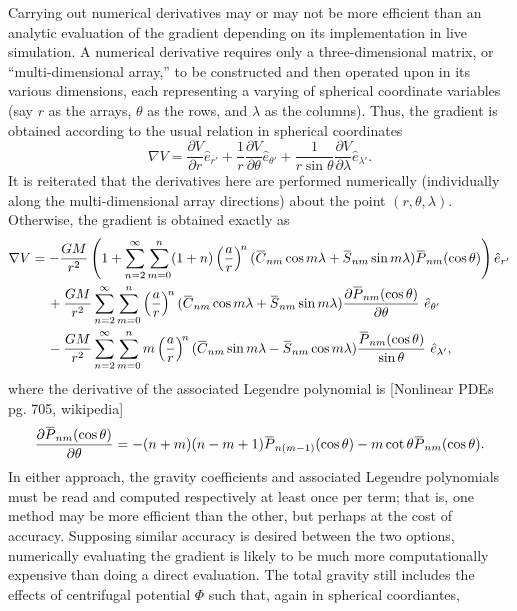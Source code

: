 \documentclass[11pt,dvipsnames]{thesis}
\newcommand{\overbar}[1]{\mkern 1.5mu\overline{\mkern-1.5mu#1\mkern-1.5mu}\mkern 1.5mu}
\begin{document}
Carrying out numerical derivatives may or may not be more efficient than an analytic evaluation of the gradient depending on its implementation in live simulation. A numerical derivative requires only a three-dimensional matrix, or ``multi-dimensional array,'' to be constructed and then operated upon in its various dimensions, each representing a varying of spherical coordinate variables (say $r$ as the arrays, $\theta$ as the rows, and $\lambda$ as the columns). Thus, the gradient is obtained according to the usual relation in spherical coordinates
\begin{equation}
\nabla V = \frac{\partial V}{\partial r} \hat{e}_{r'} + \frac{1}{r} \frac{\partial V}{\partial \theta} \hat{e}_{\theta'} + \frac{1}{r \sin\theta} \frac{\partial V}{\partial \lambda} \hat{e}_{\lambda'}.
\end{equation}
It is reiterated that the derivatives here are performed numerically (individually along the multi-dimensional array directions) about the point $(r, \theta, \lambda)$.
Otherwise, the gradient is obtained exactly as
\begin{align}
\nabla V &= -\frac{GM}{r^2} \left(1 + \sum_{n = 2}^\infty \sum_{m = 0}^n (1 + n) \left(\frac{a}{r}\right)^{\!n}(\overbar{C}_{nm} \cos m\lambda + \overbar{S}_{nm} \sin m\lambda) \overbar{P}_{nm}(\cos\theta)\right) \hat{e}_{r'} \nonumber\\
&\quad\, + \frac{GM}{r^2} \sum_{n = 2}^\infty \sum_{m = 0}^n \left(\frac{a}{r}\right)^{\!n}(\overbar{C}_{nm} \cos m\lambda + \overbar{S}_{nm} \sin m\lambda) \frac{\partial \overbar{P}_{nm}(\cos\theta)}{\partial \theta} \ \hat{e}_{\theta'} \nonumber\\
&\quad\, - \frac{GM}{r^2} \sum_{n = 2}^\infty \sum_{m = 0}^n m \left(\frac{a}{r}\right)^{\!n}(\overbar{C}_{nm} \sin m\lambda - \overbar{S}_{nm} \cos m\lambda) \frac{\overbar{P}_{nm}(\cos\theta)}{\sin\theta} \ \hat{e}_{\lambda'},
\end{align}
where the derivative of the associated Legendre polynomial is [Nonlinear PDEs pg. 705, wikipedia]
\begin{equation}
\frac{\partial \overbar{P}_{nm}(\cos\theta)}{\partial\theta} = -(n+m)(n-m+1)\overbar{P}_{n(m-1)}(\cos\theta) - m \cot\theta\overbar{P}_{nm}(\cos\theta).
\end{equation}
In either approach, the gravity coefficients and associated Legendre polynomials must be read and computed respectively at least once per term; that is, one method may be more efficient than the other, but perhaps at the cost of accuracy. Supposing similar accuracy is desired between the two options, numerically evaluating the gradient is likely to be much more computationally expensive than doing a direct evaluation. The total gravity still includes the effects of centrifugal potential $\Phi$ such that, again in spherical coordiantes,
\end{document}
